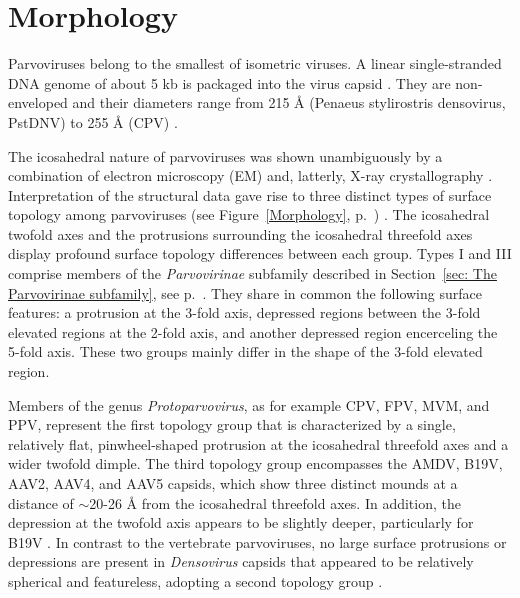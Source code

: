 
\chapter{Morphology} %

\label{Chapter3} %



\label{sec:Morphology}

Parvoviruses belong to the smallest of isometric viruses. A linear single-stranded DNA genome of about 5 kb is packaged into the virus capsid \cite{pmid4975639, pmid5264145, pmid5429749}. They are non-enveloped and their diameters range from 215 \r{A} (Penaeus stylirostris densovirus, PstDNV) to 255 \r{A} (CPV) \cite{pmid10497831, icvt}. 

The icosahedral nature of parvoviruses was shown unambiguously by a combination of electron microscopy (EM) and, latterly, X-ray crystallography \cite{pmid2006420}. Interpretation of the structural data gave rise to three distinct types of surface topology among parvoviruses (see Figure~\ref{Morphology}, p.~\pageref{Morphology}) \cite{pmid15795290}. The icosahedral twofold axes and the protrusions surrounding the icosahedral threefold axes display profound surface topology differences between each group. Types I and III comprise members of the \textit{Parvovirinae} subfamily described in Section~\ref{sec: The Parvovirinae subfamily}, see p.~\pageref{sec: The Parvovirinae subfamily}. They share in common the following surface features: a protrusion at the 3-fold axis, depressed regions between the 3-fold elevated regions at the 2-fold axis, and another depressed region encerceling the 5-fold axis. These two groups mainly differ in the shape of the 3-fold elevated region. 

Members of the genus \textit{Protoparvovirus}, as for example CPV, FPV, MVM, and PPV, represent the first topology group that is characterized by a single, relatively flat, pinwheel-shaped protrusion at the icosahedral threefold axes and a wider twofold dimple. The third topology group encompasses the AMDV, B19V, AAV2, AAV4, and AAV5 capsids, which show three distinct mounds at a distance of $\sim$20-26 \r{A} from the icosahedral threefold axes. In addition, the depression at the twofold axis appears to be slightly deeper, particularly for B19V \cite{pmid20375175, pmid12136130, tropism}. In contrast to the vertebrate parvoviruses, no large surface protrusions or depressions are present in \textit{Densovirus} capsids that appeared to be relatively spherical and featureless, adopting a second topology group \cite{pmid15769470, pmid9817847}.        


